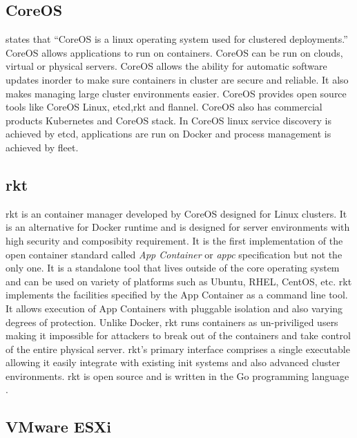 {\subsection{CoreOS \cv}
     
     \cite{www-core} states that ``CoreOS is a linux operating system
     used for clustered deployments.'' CoreOS allows applications to
     run on containers. CoreOS can be run on clouds, virtual or
     physical servers. CoreOS allows the ability for automatic software
     updates inorder to make sure containers in cluster are secure and
     reliable. It also makes managing large cluster environments
     easier. CoreOS provides open source tools like CoreOS Linux,
     etcd,rkt and flannel. CoreOS also has commercial products
     Kubernetes and CoreOS stack. In CoreOS linux service
     discovery is achieved by etcd, applications are run on Docker and
     process management is achieved by fleet.

\subsection{rkt \cv}

     rkt is an container manager developed by CoreOS \cite{www-CoreOS}
     designed for Linux clusters. It is an alternative for Docker 
     runtime and is designed for server environments with high 
     security and composibity requirement. It is the first 
     implementation of the open container standard called 
     \textit{App Container} or \textit{appc} specification but not the only one.
     It is a standalone tool that lives outside of the core operating 
     system and can be used on variety of platforms such as Ubuntu,
     RHEL, CentOS, etc. rkt implements the facilities specified by 
     the App Container as a command line tool. It allows execution 
     of App Containers with pluggable isolation and also varying 
     degrees of protection. Unlike Docker, rkt runs containers as 
     un-priviliged users making it impossible for attackers to break 
     out of the containers and take control of the entire physical 
     server. rkt's primary interface comprises a single executable 
     allowing it easily integrate with existing init systems and 
     also advanced cluster environments. rkt is open source and is 
     written in the Go programming language \cite{www-github/rkt}.

     
\subsection{VMware ESXi}

}
